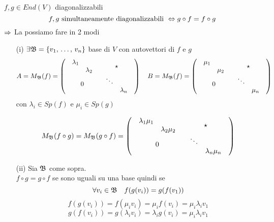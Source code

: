 \begin{prop} $f,g \in End(V)$  diagonalizzabili
$$ f,g \text{ simultaneamente diagonalizzabili } \Leftrightarrow g\circ f = f\circ g $$
\proof $\Rightarrow$ 
La possiamo fare in 2 modi 
\begin{itemize}
\item[(i)] $\exists \mathfrak{B}=\{ v_1, \, \dots , \, v_n \} $ base di $V$ con autovettori di $f$ e $g$\\
$$A=  M_{\mathfrak{B}}(f) = \left( \begin{array}{cc} \begin{array}{cc} \lambda_1 &  \\ & \lambda_2 \end{array} & \star \\  0 &  \begin{array}{cc} \ddots &  \\ & \lambda_n  \end{array} \end{array}\right) \quad 
B=M_{\mathfrak{B}}(f) = \left( \begin{array}{cc} \begin{array}{cc} \mu_1 &  \\ & \mu_2 \end{array} & \star \\  0 &  \begin{array}{cc} \ddots &  \\ & \mu_n \end{array} \end{array}\right)
$$
con  $ \lambda_i \in Sp(f) $ e $\mu_i \in Sp(g) $

$$ M_{\mathfrak{B}}(f\circ g ) =M_{\mathfrak{B}} (g\circ f ) = \left( \begin{array}{cc} \begin{array}{cc} \lambda_1 \mu_1 &  \\ & \lambda_2 \mu_2 \end{array} & \star \\  0 &  \begin{array}{cc} \ddots &  \\ & \lambda_n \mu_n \end{array} \end{array}\right)
$$

\item[(ii)] Sia $ \mathfrak{B} $ come sopra.\\
$ f\circ g = g \circ f $ se sono uguali su una base quindi se
$$ \forall v_i \in \mathfrak{B} \quad f(g(v_i))=g(f(v_1))$$
$$ f(g(v_i))=f(\mu_i v_i) =\mu_i f(v_i)=\mu_i \lambda_i v_1 $$
$$ g(f(v_i))=g(\lambda_i v_i) =\lambda_i g(v_i)=\mu_i \lambda_i v_1 $$
\end{itemize}


\end{prop}
